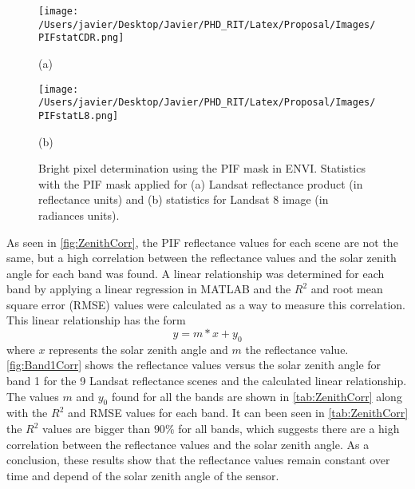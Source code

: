 \begin{figure}[!ht]
  \begin{minipage}[c]{0.48\linewidth}
    \centering
      \texttt{[image: /Users/javier/Desktop/Javier/PHD\_RIT/Latex/Proposal/Images/PIFstatCDR.png]}  
    \centerline{(a)}\medskip
  \end{minipage}
  \hfill
  \begin{minipage}[d]{0.48\linewidth}
    \centering
      \texttt{[image: /Users/javier/Desktop/Javier/PHD\_RIT/Latex/Proposal/Images/PIFstatL8.png]}
    \centerline{(b)}\medskip
  \end{minipage}
  \caption{Bright pixel determination using the PIF mask in ENVI. Statistics with the PIF mask applied for (a) Landsat reflectance product (in reflectance units) and (b) statistics for Landsat 8 image (in radiances units). \label{fig:PIFstats} } 
\end{figure}

As seen in \autoref{fig:ZenithCorr}, the PIF reflectance values for each scene are not the same, but a high correlation between the reflectance values and the solar zenith angle for each band was found. A linear relationship was determined for each band by applying a linear regression in MATLAB and the $R^2$ and root mean square error (RMSE) values were calculated as a way to measure this correlation. This linear relationship has the form 
\begin{equation}
	y = m*x + y_0
	\label{eq:linear}
\end{equation}
where $x$ represents the solar zenith angle and $m$ the reflectance value. \autoref{fig:Band1Corr} shows the reflectance values versus the solar zenith angle for band 1 for the 9 Landsat reflectance scenes and the calculated linear relationship. The values $m$ and $y_0$ found for all the bands are shown in \autoref{tab:ZenithCorr} along with the $R^2$ and RMSE values for each band. It can been seen in \autoref{tab:ZenithCorr} the $R^2$ values are bigger than $90\%$ for all bands, which suggests there are a high correlation between the reflectance values and the solar zenith angle. As a conclusion, these results show that the reflectance values remain constant over time and depend of the solar zenith angle of the sensor. 

